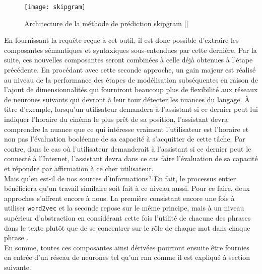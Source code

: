 \begin{figure}[ht]
  \centering
  \texttt{[image: skipgram]}
  \caption{Architecture de la méthode de prédiction \gls{skipgram} []}
  \label{fig:skipgram}
\end{figure}

En fournissant la requête reçue à cet outil, il est donc possible d'extraire les composantes sémantiques et syntaxiques sous-entendues par cette dernière. Par la suite, ces nouvelles composantes seront combinées à celle déjà obtenues à l'étape précédente. En procédant avec cette seconde approche, un gain majeur est réalisé au niveau de la performance des étapes de modélisation subséquentes en raison de l'ajout de dimensionnalités qui fourniront beaucoup plus de flexibilité aux réseaux de neurones suivants qui devront à leur tour détecter les nuances du langage. À titre d'exemple, lorsqu'un utilisateur demandera à l'assistant si ce dernier peut lui indiquer l'horaire du cinéma le plus prêt de sa position, l'assistant devra comprendre la nuance que ce qui intéresse vraiment l'utilisateur est l'horaire et non pas l'évaluation booléenne de sa capacité à s'acquitter de cette tâche. Par contre, dans le cas où l'utilisateur demanderait à l'assistant si ce dernier peut le connecté à l'Internet, l'assistant devra dans ce cas faire l'évaluation de sa capacité et répondre par affirmation à ce cher utilisateur. \\

Mais qu'en est-il de nos sources d'informations? En fait, le processus entier bénéficiera qu'un travail similaire soit fait à ce niveau aussi. Pour ce faire, deux approches s'offrent encore à nous. La première consistant encore une fois à utiliser \texttt{word2vec} et la seconde repose sur le même principe, mais à un niveau supérieur d'abstraction en considérant cette fois l'utilité de chacune des phrases dans le texte plutôt que de se concentrer sur le rôle de chaque mot dans chaque phrase \cite{inferSent}. \\

En somme, toutes ces composantes ainsi dérivées pourront ensuite être fournies en entrée d'un réseau de neurones tel qu'un \gls{rnn} comme il est expliqué à section suivante.
